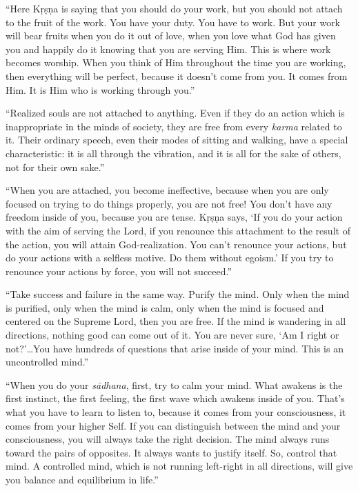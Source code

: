 \enquote{Here Kṛṣṇa is saying that you should do your work, but you should not attach to the fruit of the work. You have your duty. You have to work. But your work will bear fruits when you do it out of love, when you love what God has given you and happily do it knowing that you are serving Him. This is where work becomes worship. When you think of Him throughout the time you are working, then everything will be perfect, because it doesn’t come from you. It comes from Him. It is Him who is working through you.}

\enquote{Realized souls are not attached to anything. Even if they do an action which is inappropriate in the minds of society, they are free from every \textit{karma} related to it. Their ordinary speech, even their modes of sitting and walking, have a special characteristic: it is all through the vibration, and it is all for the sake of others, not for their own sake.}

\enquote{When you are attached, you become ineffective, because when you are only focused on trying to do things properly, you are not free! You don’t have any freedom inside of you, because you are tense. Kṛṣṇa says, \enquote{If you do your action with the aim of serving the Lord, if you renounce this attachment to the result of the action, you will attain God-realization. You can’t renounce your actions, but do your actions with a selfless motive. Do them without egoism.} If you try to renounce your actions by force, you will not succeed.}

\enquote{Take success and failure in the same way. Purify the mind. Only when the mind is purified, only when the mind is calm, only when the mind is focused and centered on the Supreme Lord, then you are free. If the mind is wandering in all directions, nothing good can come out of it. You are never sure, \enquote{Am I right or not?}\ldots You have hundreds of questions that arise inside of your mind. This is an uncontrolled mind.}

\enquote{When you do your \textit{sādhana}, first, try to calm your mind. What awakens is the first instinct, the first feeling, the first wave which awakens inside of you. That's what you have to learn to listen to, because it comes from your consciousness, it comes from your higher Self. If you can distinguish between the mind and your consciousness, you will always take the right decision. The mind always runs toward the pairs of opposites. It always wants to justify itself. So, control that mind. A controlled mind, which is not running left-right in all directions, will give you balance and equilibrium in life.}

